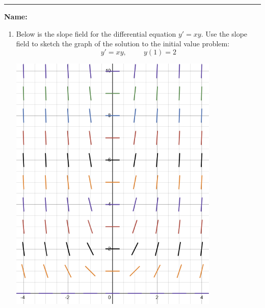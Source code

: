 \documentclass[11pt]{article}
\begin{document}
    \hrule
    \vspace{.5cm}
    \noindent\textbf{Name:} \underline{\qquad\qquad\qquad\qquad\qquad\qquad\qquad\qquad\qquad\qquad\qquad\qquad\qquad}

    \begin{enumerate}
        \item Below is the slope field for the differential equation $y'=xy$. Use the slope field to sketch the graph of the solution to the initial value problem:
        $$y'=xy,\hspace{1cm}y(1)=2$$
        \begin{center}
            \includegraphics[width=10cm]{F24/Classwork 13/WS y'=xy.png}
        \end{center}


\end{enumerate}
\end{document}
